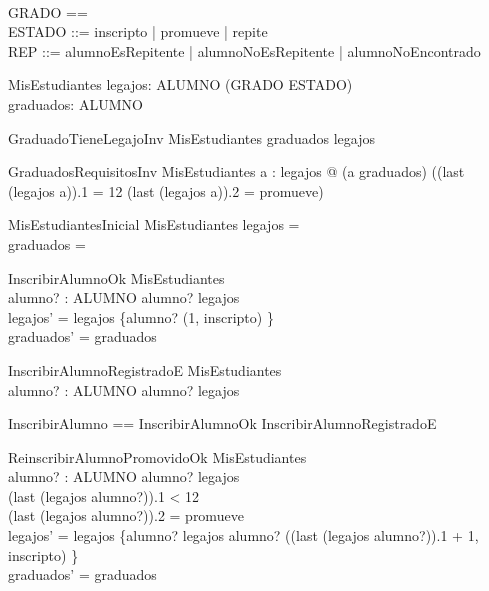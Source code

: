\begin{zed}
    [ALUMNO] \\
    GRADO == \nat \\
    ESTADO ::= inscripto | promueve | repite \\
    REP ::= alumnoEsRepitente | alumnoNoEsRepitente | alumnoNoEncontrado
\end{zed}

\begin{schema}{MisEstudiantes}
    legajos: ALUMNO \pfun \seq (GRADO \cross ESTADO) \\
    graduados: \power ALUMNO
\end{schema}

\begin{schema}{GraduadoTieneLegajoInv}
    MisEstudiantes
    \where
    graduados \subseteq \dom legajos
\end{schema}

\begin{schema}{GraduadosRequisitosInv}
    MisEstudiantes
    \where
    \forall a : \dom legajos @ (a \in graduados) \iff ((last \; (legajos \; a)).1 = 12 \land (last \; (legajos \; a)).2 = promueve)
\end{schema}

\begin{schema}{MisEstudiantesInicial}
    MisEstudiantes
    \where
    legajos = \emptyset \\
    graduados = \emptyset
\end{schema}

\begin{schema}{InscribirAlumnoOk}
    \Delta MisEstudiantes \\
    alumno? : ALUMNO
    \where
    alumno? \notin \dom legajos \\
    legajos' = legajos \cup \{alumno? \mapsto \langle (1, inscripto) \rangle\} \\
    graduados' = graduados
\end{schema}

\begin{schema}{InscribirAlumnoRegistradoE}
    \Xi MisEstudiantes \\
    alumno? : ALUMNO
    \where
    alumno? \in \dom legajos
\end{schema}

\begin{zed}
    InscribirAlumno == InscribirAlumnoOk \lor InscribirAlumnoRegistradoE
\end{zed}

\begin{schema}{ReinscribirAlumnoPromovidoOk}
    \Delta MisEstudiantes \\
    alumno? : ALUMNO
    \where
    alumno? \in \dom legajos \\
    (last \; (legajos \; alumno?)).1 < 12 \\ 
    (last \; (legajos \; alumno?)).2 = promueve \\
    legajos' = legajos \oplus \{alumno? \mapsto legajos \; alumno? \cat \langle ((last \; (legajos \; alumno?)).1 + 1, inscripto) \rangle\} \\
    graduados' = graduados
\end{schema}

